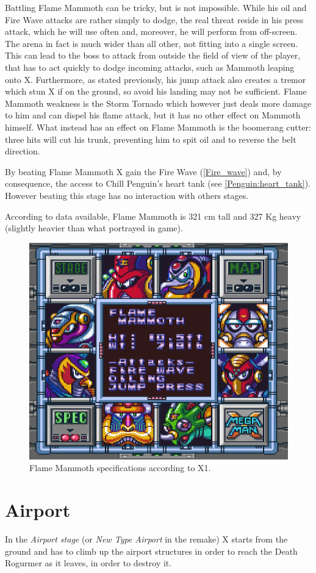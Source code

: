 Battling Flame Mammoth can be tricky, but is not impossible. While his oil and Fire Wave attacks are rather simply to dodge, the real threat reside in his press attack, which he will use often and, moreover, he will perform from off-screen. The arena in fact is much wider than all other, not fitting into a single screen. This can lead to the boss to attack from outside the field of view of the player, that has  to act quickly to dodge incoming attacks, such as Mammoth leaping onto X. Furthermore, as stated previously, his jump attack also creates a tremor which stun X if on the ground, so avoid his landing may not be sufficient. Flame Mammoth weakness is the Storm Tornado which however just deals more damage to him and can dispel his flame attack, but it has no other effect on Mammoth himself. What instead has an effect on Flame Mammoth is the boomerang cutter: three hits will cut his trunk, preventing him to spit oil and to reverse the belt direction.

By beating Flame Mammoth X gain the Fire Wave (\ref{Fire_wave}) and, by consequence, the access to Chill Penguin's heart tank (see \ref{Penguin:heart_tank}). However beating this stage has no interaction with others stages.

According to data available, Flame Mammoth is 321 cm tall and 327 Kg heavy (slightly heavier than what portrayed in game).

\begin{figure}[h]
	\centering
	\includegraphics[width=0.5\linewidth]{figures/X1/Flame_mammoth_specs.jpg}
	\caption{Flame Mammoth specifications according to X1.}
\end{figure}
\section{Airport}
In the \textit{Airport stage} (or \textit{New Type Airport} in the remake) X starts from the ground and has to climb up the airport structures in order to reach the Death Rogurmer as it leaves, in order to destroy it. 

